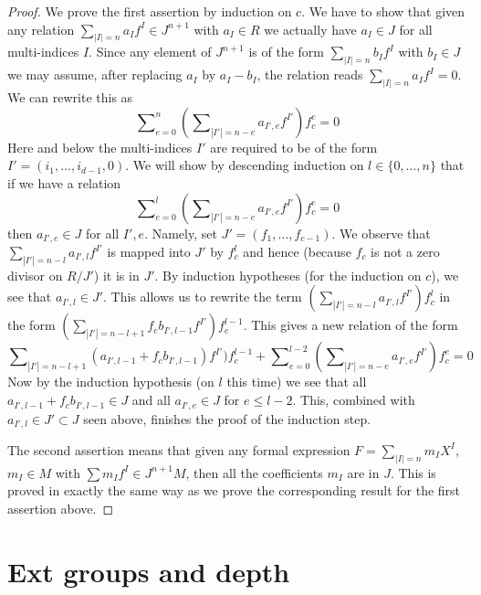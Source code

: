 \begin{proof}
We prove the first assertion by induction on $c$.
We have to show that given any relation
$\sum_{|I| = n} a_I f^I \in J^{n + 1}$ with $a_I \in R$ we
actually have $a_I \in J$ for all multi-indices $I$. Since
any element of $J^{n + 1}$ is of the form $\sum_{|I| = n} b_I f^I$
with $b_I \in J$ we may assume, after replacing $a_I$ by $a_I - b_I$,
the relation reads $\sum_{|I| = n} a_I f^I = 0$. We can rewrite
this as
$$
\sum\nolimits_{e = 0}^n
\left(
\sum\nolimits_{|I'| = n - e}
a_{I', e} f^{I'}
\right)
f_c^e
=
0
$$
Here and below the multi-indices $I'$ are required to be of the form
$I' = (i_1, \ldots, i_{d-1}, 0)$. We will show by descending
induction on $l \in \{0, \ldots, n\}$
that if we have a relation
$$
\sum\nolimits_{e = 0}^l
\left(
\sum\nolimits_{|I'| = n - e}
a_{I', e} f^{I'}
\right)
f_c^e
=
0
$$
then $a_{I', e} \in J$ for all $I', e$.
Namely, set $J' = (f_1, \ldots, f_{c-1})$.
We observe that $\sum\nolimits_{|I'| = n - l} a_{I', l} f^{I'}$
is mapped into $J'$ by $f_c^{l}$ and hence
(because $f_c$ is not a zero divisor on $R/J'$) it is in $J'$.
By induction hypotheses (for the induction on $c$),
we see that $a_{I', l} \in J'$.
This allows us to rewrite the term
$(\sum\nolimits_{|I'| = n - l} a_{I', l} f^{I'})f_c^l$
in the form $(\sum\nolimits_{|I'| = n - l + 1} f_c b_{I', l - 1}
f^{I'})f_c^{l-1}$. This gives a new relation of the form
$$
\sum\nolimits_{|I'| = n - l + 1}
(a_{I', l-1} + f_c b_{I', l - 1}) f^{I'})f_c^{l-1}
+
\sum\nolimits_{e = 0}^{l - 2}
\left(
\sum\nolimits_{|I'| = n - e}
a_{I', e} f^{I'}
\right)
f_c^e
=
0
$$
Now by the induction hypothesis (on $l$ this time) we see that
all $a_{I', l-1} + f_c b_{I', l - 1} \in J$ and
all $a_{I', e} \in J$ for $e \leq l - 2$. This, combined with
$a_{I', l} \in J' \subset J$ seen above, finishes the proof of the
induction step.

\medskip\noindent
The second assertion means that given any formal expression
$F = \sum_{|I| = n} m_I X^I$, $m_I \in M$ with $\sum m_I f^I
\in J^{n + 1}M$, then all the coefficients $m_I$ are in $J$.
This is proved in exactly the same way as we prove the corresponding
result for the first assertion above.
\end{proof}











\section{Ext groups and depth}
\label{section-ext}

